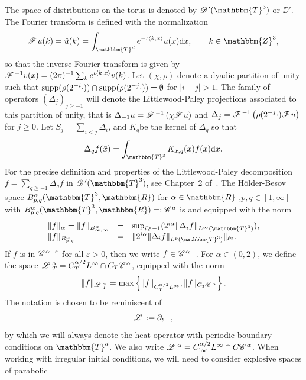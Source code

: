 \begin{appendices}
The space of distributions on the torus is denoted by $\DD' (\mathbbm{T}^3)$
or $\DD'$. The Fourier transform is defined with the normalization
\[ \CF u (k) = \hat{u} (k) = \int_{\mathbbm{T}^d} e^{- \iota \langle k, x
   \rangle} u (x) \mathd x, \qquad k \in \mathbbm{Z}^3, \]
so that the inverse Fourier transform is given by $\mathscr{F} \hspace{.1em}^{- 1} v (x) = (2
\pi)^{- 1} \sum_k e^{\iota \langle k, x \rangle} v (k)$. Let $(\chi, \rho)$
denote a dyadic partition of unity such that $\operatorname{supp} (\rho (2^{- i}
\cdot)) \cap \operatorname{supp} (\rho (2^{- j} \cdot)) = \emptyset$ for $|i - j|
> 1$. The family of operators $(\Delta_j)_{j \ge - 1}$ will denote the
Littlewood-Paley projections associated to this partition of unity, that is
$\Delta_{- 1} u = \mathscr{F} \hspace{.1em}^{- 1} \left( \chi \mathscr{F} \hspace{.1em} u \right)$ and $\Delta_j = \mathscr{F} \hspace{.1em}^{-
1} \left( \rho (2^{- j}  \cdot) \mathscr{F} \hspace{.1em} u \right)$ for $j \ge 0$. Let
$S_j = \sum_{i < j} \Delta_i$, and $K_q$\quad be the kernel of $\Delta_q$ so
that
\[ \Delta_q f (\bar{x}) = \int_{\mathbbm{T}^3} K_{\bar{x}, q} (x) f (x) \mathd
   x. \]
For the precise definition and properties of the Littlewood-Paley
decomposition $f = \sum_{q \geqslant - 1} \Delta_q f$ in $\DD'
(\mathbbm{T}^3)$, see Chapter~2 of~{\cite{Bahouri2011}}. The H{\"o}lder-Besov
space $B^{\alpha}_{p, q} (\mathbbm{T}^3, \mathbbm{R})$ for $\alpha \in
\mathbbm{R}$ ,$p, q \in [1, \infty]$ with $B^{\alpha}_{p, q} (\mathbbm{T}^3,
\mathbbm{R}) = : \CC^a$ is and equipped with the norm
\[ \begin{array}{lll}
     \lVert f \rVert_{\alpha} = \lVert f \rVert_{B^{\alpha}_{\infty, \infty}}
     & = & \sup_{i \geqslant - 1} (2^{i \alpha} \| \Delta_i f \|_{L^{\infty}
     (\mathbbm{T}^3)}),\\
     \lVert f \rVert_{B^{\alpha}_{p, q}} & = & \| 2^{i \alpha} \| \Delta_i f
     \|_{L^p (\mathbbm{T}^3)} \|_{\ell^q} .
   \end{array} \]
If $f$ is in $\mathscr{C} \hspace{.1em}^{\alpha - \varepsilon}$ for all $\varepsilon > 0$, then we
write $f \in \mathscr{C} \hspace{.1em}^{\alpha -}$. For $\alpha \in (0, 2)$, we define the space
$\mathscr{L} \hspace{.2em}_T^{\alpha} = C^{\alpha / 2}_T L^{\infty} \cap C_T \mathscr{C} \hspace{.1em}^{\alpha}$, equipped
with the norm
\[ \| f \|_{\mathscr{L} \hspace{.2em}_T^{\alpha}} = \max \left\{ \| f \|_{C^{\alpha / 2}_T
   L^{\infty}}, \| f \|_{C_T \mathscr{C} \hspace{.1em}^{\alpha}} \right\} . \]
The notation is chosen to be reminiscent of
\[ \mathscr{L} \hspace{.2em} := \partial_t -, \]
by which we will always denote the heat operator with periodic boundary
conditions on $\mathbbm{T}^d$. We also write $\mathscr{L} \hspace{.2em}^{\alpha} = C^{\alpha /
2}_{\operatorname{loc}} L^{\infty} \cap C \mathscr{C} \hspace{.1em}^{\alpha}$. When working with irregular
initial conditions, we will need to consider explosive spaces of parabolic

\end{appendices}
